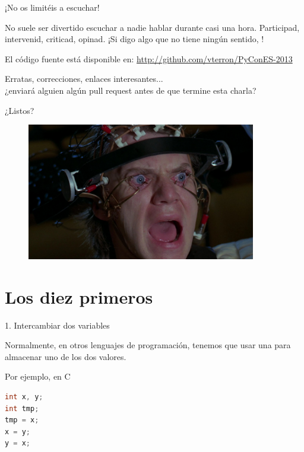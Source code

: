 \documentclass[14pt]{beamer}
\begin{document}
\begin{frame}{¡No os limitéis a escuchar!}
  \begin{center}
    No suele ser divertido escuchar a nadie hablar durante casi una
    hora. Participad, intervenid, criticad, opinad. ¡Si digo algo que
    no tiene ningún sentido, !
  \end{center}

  \begin{block}{\centering El código fuente está disponible en:}
    \centering \url{http://github.com/vterron/PyConES-2013}
  \end{block}

  \begin{center}
    \small Erratas, correcciones, enlaces interesantes...\\ ¿enviará
    alguien algún pull request antes de que termine esta charla?
  \end{center}
\end{frame}

\begin{frame}{}
  \begin{alertblock}{}
    \centering \Large ¿Listos?
  \end{alertblock}

  \begin{figure}
    \centering
    \includegraphics[height=6cm]{pics/a-clockwork-orange.jpg}
  \end{figure}
\end{frame}

\section{Los diez primeros}

\begin{frame}[fragile]{1. Intercambiar dos variables}

  \begin{center}
    Normalmente, en otros lenguajes de programación, tenemos que usar
    una  para almacenar uno de los dos
    valores.
  \end{center}

  \small
  \begin{exampleblock}{Por ejemplo, en C}
    \begin{lstlisting}[language=C]
int x, y;
int tmp;
tmp = x;
x = y;
y = x;
    \end{lstlisting}
  \end{exampleblock}
\end{frame}
\end{document}
